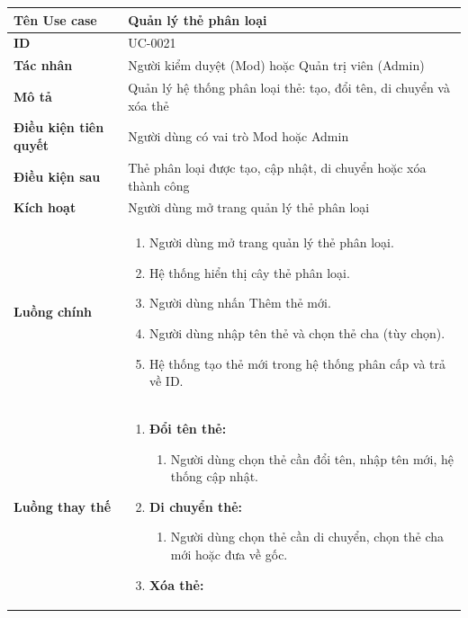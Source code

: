 {
\small
\renewcommand{\arraystretch}{1.15}

\begin{tabularx}{\textwidth}{|>{\raggedright\arraybackslash}p{3.5cm}|>{\raggedright\arraybackslash}X|}
\hline
\textbf{Tên Use case} & Quản lý thẻ phân loại \\
\hline
\textbf{ID} & UC-0021 \\
\hline
\textbf{Tác nhân} & Người kiểm duyệt (Mod) hoặc Quản trị viên (Admin) \\
\hline
\textbf{Mô tả} & Quản lý hệ thống phân loại thẻ: tạo, đổi tên, di chuyển và xóa thẻ \\
\hline
\textbf{Điều kiện tiên quyết} & Người dùng có vai trò Mod hoặc Admin \\
\hline
\textbf{Điều kiện sau} & Thẻ phân loại được tạo, cập nhật, di chuyển hoặc xóa thành công \\
\hline
\textbf{Kích hoạt} & Người dùng mở trang quản lý thẻ phân loại \\
\hline
\textbf{Luồng chính} &
\begin{enumerate}
    \item Người dùng mở trang quản lý thẻ phân loại.
    \item Hệ thống hiển thị cây thẻ phân loại.
    \item Người dùng nhấn Thêm thẻ mới.
    \item Người dùng nhập tên thẻ và chọn thẻ cha (tùy chọn).
    \item Hệ thống tạo thẻ mới trong hệ thống phân cấp và trả về ID.
\end{enumerate} \\
\hline
\textbf{Luồng thay thế} &
\begin{enumerate}
    \item \textbf{Đổi tên thẻ:}
    \begin{enumerate}
        \item[3A.] Người dùng chọn thẻ cần đổi tên, nhập tên mới, hệ thống cập nhật.
    \end{enumerate}
    \item \textbf{Di chuyển thẻ:}
    \begin{enumerate}
        \item[3B.] Người dùng chọn thẻ cần di chuyển, chọn thẻ cha mới hoặc đưa về gốc.
    \end{enumerate}
    \item \textbf{Xóa thẻ:}
    \begin{enumerate}

\end{enumerate}
\end{enumerate}
\end{tabularx}}
